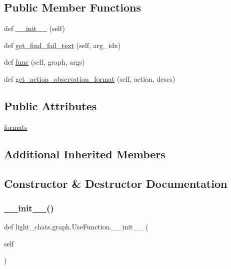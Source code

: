 \subsection*{Public Member Functions}
\begin{DoxyCompactItemize}
\item 
def \hyperlink{classlight__chats_1_1graph_1_1UseFunction_a4a49f4428084f1be52388a47f31bdd19}{\+\_\+\+\_\+init\+\_\+\+\_\+} (self)
\item 
def \hyperlink{classlight__chats_1_1graph_1_1UseFunction_a44e9ef0d0d915c32926944fd4da8e332}{get\+\_\+find\+\_\+fail\+\_\+text} (self, arg\+\_\+idx)
\item 
def \hyperlink{classlight__chats_1_1graph_1_1UseFunction_a75a1cb4d8d51f0336a3d5cd9f005e266}{func} (self, graph, args)
\item 
def \hyperlink{classlight__chats_1_1graph_1_1UseFunction_ae9056a0aa6e94b1d11be472b2549b2c2}{get\+\_\+action\+\_\+observation\+\_\+format} (self, action, descs)
\end{DoxyCompactItemize}
\subsection*{Public Attributes}
\begin{DoxyCompactItemize}
\item 
\hyperlink{classlight__chats_1_1graph_1_1UseFunction_ab5894266d221cc0d34b1e653b4bafc2d}{formats}
\end{DoxyCompactItemize}
\subsection*{Additional Inherited Members}


\subsection{Constructor \& Destructor Documentation}
\mbox{\label{classlight__chats_1_1graph_1_1UseFunction_a4a49f4428084f1be52388a47f31bdd19}} 
\subsubsection{\texorpdfstring{\+\_\+\+\_\+init\+\_\+\+\_\+()}{\_\_init\_\_()}}
{\footnotesize\ttfamily def light\+\_\+chats.\+graph.\+Use\+Function.\+\_\+\+\_\+init\+\_\+\+\_\+ (\begin{DoxyParamCaption}\item[{}]{self }\end{DoxyParamCaption})}



